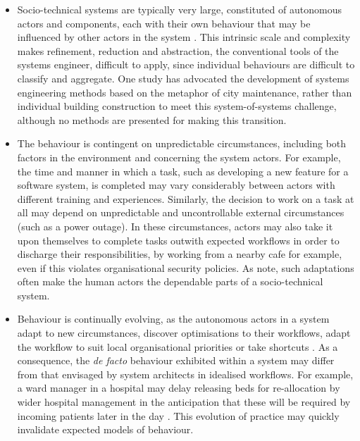 \documentclass{sig-alternate}
\begin{document}
\begin{itemize}

\item Socio-technical systems are typically very large, constituted of
  autonomous actors and components, each with their own behaviour that may be
  influenced by other actors in the system
  \cite{crabtree00ethnomethodologically}.  This intrinsic scale and complexity
  makes refinement, reduction and abstraction, the conventional tools of the
  systems engineer, difficult to apply, since individual behaviours are
  difficult to classify and aggregate.  One study has advocated the development
  of systems engineering methods based on the metaphor of city maintenance,
  rather than individual building construction \citep{feiler06ultra} to meet
  this system-of-systems challenge, although no methods are presented for making
  this transition.

\item The behaviour is contingent on unpredictable circumstances, including both
  factors in the environment and concerning the system actors.  For example, the
  time and manner in which a task, such as developing a new feature for a
  software system, is completed may vary considerably between actors with
  different training and experiences.  Similarly, the decision to work on a task
  at all may depend on unpredictable and uncontrollable external circumstances
  (such as a power outage).  In these circumstances, actors may also take it
  upon themselves to complete tasks outwith expected workflows in order to
  discharge their responsibilities, by working from a nearby cafe for example,
  even if this violates organisational security policies.  As
  \citet{besnard03human} note, such adaptations often make the human actors the
  dependable parts of a socio-technical system.

\item Behaviour is continually evolving, as the autonomous actors in a system
  adapt to new circumstances, discover optimisations to their workflows, adapt
  the workflow to suit local organisational priorities or take shortcuts
  \citep{bonen79evolutionary,Lyytinen2008,anderson04heterogeneous}.  As a
  consequence, the \emph{de facto} behaviour exhibited within a system may differ
  from that envisaged by system architects in idealised workflows.  For example,
  a ward manager in a hospital may delay releasing beds for re-allocation by
  wider hospital management in the anticipation that these will be required by
  incoming patients later in the day \citep{dewsbury07responsibility}.  This
  evolution of practice may quickly invalidate expected models of behaviour.

\end{itemize}
\end{document}

